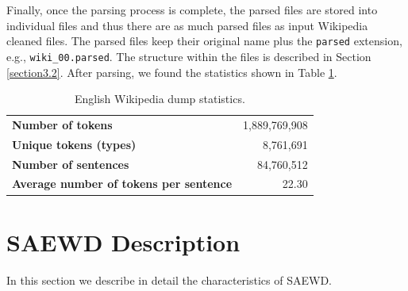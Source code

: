  Finally, once the parsing process is complete, the parsed files are stored into individual files and thus there are as much parsed files as input Wikipedia cleaned files. The parsed files keep their original name plus the \texttt{parsed} extension, e.g., \texttt{wiki\_00.parsed}. The structure within the files is described in Section \ref{section3.2}. After parsing, we found the statistics shown in Table \ref{tab:corpus_stats}.
 
\begin{table}[t]
\centering
\caption{English Wikipedia dump statistics.}
\label{tab:corpus_stats}
\begin{tabular}{lr}
{\bf Number of tokens}      & 1,889,769,908 \\
{\bf Unique tokens (types)} & 8,761,691 \\
{\bf Number of sentences}   &  84,760,512\\
{\bf Average number of tokens per sentence} & 22.30
\end{tabular}
\end{table}

\section{SAEWD Description}\label{text:description}
In this section we describe in detail the characteristics of SAEWD.




